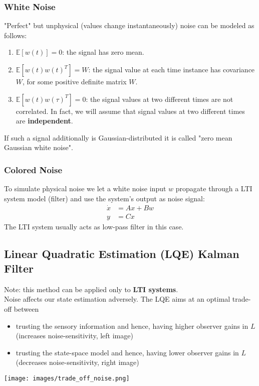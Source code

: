 \subsubsection{White Noise}
"Perfect" but unphysical (values change instantaneously) noise can be modeled as follows:
\begin{enumerate}
    \item $\mathbb{E}[w(t)]=0$: the signal has zero mean.
    \item $\mathbb{E}[w(t)w(t)^T]=W$: the signal value at each time instance has covariance $W$, for some positive definite matrix $W.$
    \item $\mathbb{E}[w(t)w(\tau)^T]=0$: the signal values at two different times are not correlated. In fact, we will assume that signal values at two different times are \textbf{independent}.
\end{enumerate}
If such a signal additionally is Gaussian-distributed it is called "zero mean Gaussian white noise".

\subsubsection{Colored Noise}
To simulate physical noise we let a white noise input $w$ propagate through a LTI system model (filter) and use the system's output as noise signal:
\begin{align*}
    \dot{x} & =Ax+Bw \\
    y       & = Cx
\end{align*}
The LTI system usually acts as low-pass filter in this case.


\subsection{Linear Quadratic Estimation (LQE) Kalman Filter}
Note: this method can be applied only to \textbf{LTI systems}.\\
Noise affects our state estimation adversely. The LQE aims at an optimal trade-off between
\begin{itemize}
    \item trusting the sensory information and hence, having higher observer gains in $L$ (increases noise-sensitivity, left image)
    \item trusting the state-space model and hence, having lower observer gains in $L$ (decreases noise-sensitivity, right image)
\end{itemize}
\begin{center}
    \texttt{[image: images/trade\_off\_noise.png]}
\end{center}


